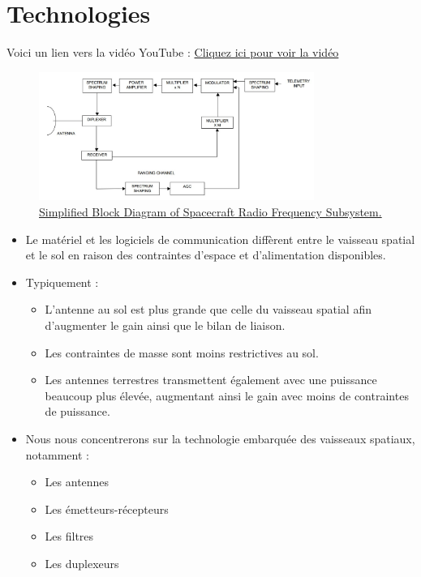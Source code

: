 \section{Technologies}
Voici un lien vers la vid\'eo YouTube :  
\href{https://youtu.be/xMGjdUp73b8?list=PLSiaem2m0wQ0eRmm17OQ-GjAeBgjRirO2}{Cliquez ici pour voir la vid\'eo}

\begin{figure}[H] %
    \centering
    \includegraphics[width=0.8\textwidth]{figures/6-65.jpg}
    \caption{\href{https://www.researchgate.net/publication/242211974_CCSDS_-_SFCG_EFFICIENT_MODULATION_METHODS_STUDY_A_COMPARISON_OF_MODULATION_SCHEMES_PHASE_2_SPECTRUM_SHAPING}{Simplified Block Diagram of Spacecraft Radio Frequency Subsystem.}}
    \label{fig:communication2}
\end{figure}

\begin{itemize}
    \item Le mat\'eriel et les logiciels de communication diff\`erent entre le vaisseau spatial et le sol en raison des contraintes d’espace et d’alimentation disponibles.
    \item Typiquement :
    \begin{itemize}
        \item L’antenne au sol est plus grande que celle du vaisseau spatial afin d’augmenter le gain ainsi que le bilan de liaison.
        \item Les contraintes de masse sont moins restrictives au sol.
        \item Les antennes terrestres transmettent \'egalement avec une puissance beaucoup plus \'elev\'ee, augmentant ainsi le gain avec moins de contraintes de puissance.
    \end{itemize}
    \item Nous nous concentrerons sur la technologie embarqu\'ee des vaisseaux spatiaux, notamment :
    \begin{itemize}
        \item Les antennes
        \item Les \'emetteurs-r\'ecepteurs
        \item Les filtres
        \item Les duplexeurs
    \end{itemize}
\end{itemize}

